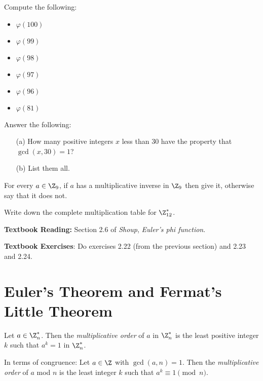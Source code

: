 \documentclass[oneside,12pt]{amsart}
\begin{document}
\begin{homework} Compute the following:
\begin{itemize}
\item $\varphi(100)$
\item $\varphi(99)$
\item $\varphi(98)$
\item $\varphi(97)$
\item $\varphi(96)$
\item $\varphi(81)$
\end{itemize}
\end{homework}

\begin{homework} Answer the following:

\begin{itemize}
\item[(a)] How many positive integers $x$ less than 30 have the property that $\gcd(x,30) = 1$?
\item[(b)] List them all.
\end{itemize}

\end{homework}

\begin{homework}
For every $a\in\Z_{9}$, if $a$ has a multiplicative inverse in $\Z_9$ then give it, otherwise
say that it does not.
\end{homework}

\begin{homework}
Write down the complete multiplication table for $\Z^*_{12}$.
\end{homework}

\bigskip

\textbf{Textbook Reading:} Section 2.6 of \emph{Shoup}, \emph{Euler's phi function}.

\textbf{Textbook Exercises}: Do exercises 2.22 (from the previous section) and 2.23 and 2.24.


\newpage

\section{Euler's Theorem and Fermat's Little Theorem}


\begin{definition}
Let $a\in\Z_n^*$. Then the \emph{multiplicative order} of $a$ in $\Z_n^*$ is the least positive integer $k$ such that $a^k=1$ in $\Z_n^*$.

In terms of congruence: Let $a\in\Z$ with $\gcd(a,n)=1$. Then the \emph{multiplicative order} of $a$ mod $n$ is the least integer $k$ such
that $a^k\equiv 1 \pmod n$.
\end{definition}
\end{document}
